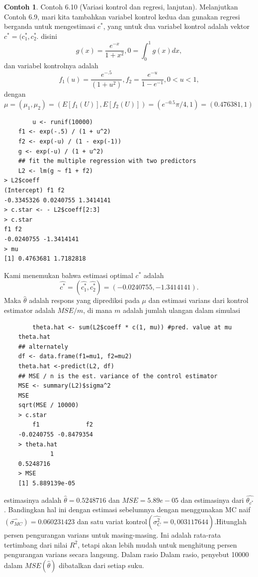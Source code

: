 \documentclass[a4paper,12pt]{article}
\theoremstyle{definition}
\newtheorem{example}{Contoh}[section]
\begin{document}
\begin{example}
    Contoh 6.10 (Variasi kontrol dan regresi, lanjutan). Melanjutkan Contoh 6.9, mari kita tambahkan variabel kontrol kedua dan gunakan regresi berganda untuk mengestimasi $c^{*}$, yang untuk dua variabel kontrol adalah vektor $c^{*}=(c^{*}_{1},c^{*}_{2}$. disini 
    \begin{equation*}
        g(x)=\frac{e^{-x}}{1+x^{2}},0=\int_{0}^{1}g(x)dx,
    \end{equation*}
    dan variabel kontrolnya adalah
    \begin{equation*}
        f_{1}(u)=\frac{e^{-.5}}{(1+u^{2})}, f_{2}=\frac{e^{-u}}{1-e^{-1}},0<u<1,
    \end{equation*}
    dengan
    $\mu=(\mu_{1},\mu_{2})=(E\left [ f_{1}(U) \right ],E\left [ f_{2}(U) \right ])=(e^{-0.5}\pi/4,1)=(0.476381,1)$
    \begin{lstlisting}
        u <- runif(10000)
    f1 <- exp(-.5) / (1 + u^2)
    f2 <- exp(-u) / (1 - exp(-1))
    g <- exp(-u) / (1 + u^2)
    ## fit the multiple regression with two predictors
    L2 <- lm(g ~ f1 + f2)
> L2$coeff
(Intercept) f1 f2
-0.3345326 0.0240755 1.3414141
> c.star <- - L2$coeff[2:3]
> c.star
f1 f2
-0.0240755 -1.3414141
> mu
[1] 0.4763681 1.7182818
    \end{lstlisting}
    Kami menemukan bahwa estimasi optimal $c^{*}$ adalah
    \begin{equation*}
        \widehat{c^{*}}=(\widehat{c^{*}_{1}},\widehat{c^{*}_{2}})=(-0.0240755,-1.3414141).
    \end{equation*}
    Maka $\widehat{\theta}$ adalah respons yang diprediksi pada $\mu$ dan estimasi varians dari kontrol estimator adalah $MSE/m$, di mana $m$ adalah jumlah ulangan dalam simulasi
    \begin{lstlisting}
        theta.hat <- sum(L2$coeff * c(1, mu)) #pred. value at mu
    theta.hat
    ## alternately
    df <- data.frame(f1=mu1, f2=mu2)
    theta.hat <-predict(L2, df)
    ## MSE / n is the est. variance of the control estimator
    MSE <- summary(L2)$sigma^2
    MSE
    sqrt(MSE / 10000)
    > c.star
        f1             f2
    -0.0240755 -0.8479354
    > theta.hat
             1
    0.5248716
    > MSE
    [1] 5.889139e-05
    \end{lstlisting}
\end{example}
estimasinya adalah $\widehat{\theta}=0.5248716$ dan $MSE=5.89e-05$ dan estimasinya dari $\widehat{\theta_{c^{*}}}$. Bandingkan hal ini dengan estimasi sebelumnya dengan menggunakan MC naif $(\widehat{\sigma_{MC}})=0.060231423$ dan satu variat kontrol$(\widehat{\sigma^{2}_{C}}=0,003117644)$.Hitunglah persen pengurangan varians untuk masing-masing. Ini adalah rata-rata tertimbang dari nilai $R^{2}$, tetapi akan lebih mudah untuk menghitung persen pengurangan varians secara langsung. Dalam rasio Dalam rasio, penyebut 10000 dalam $MSE(\widehat{\theta})$ dibatalkan dari setiap suku.
\end{document}
